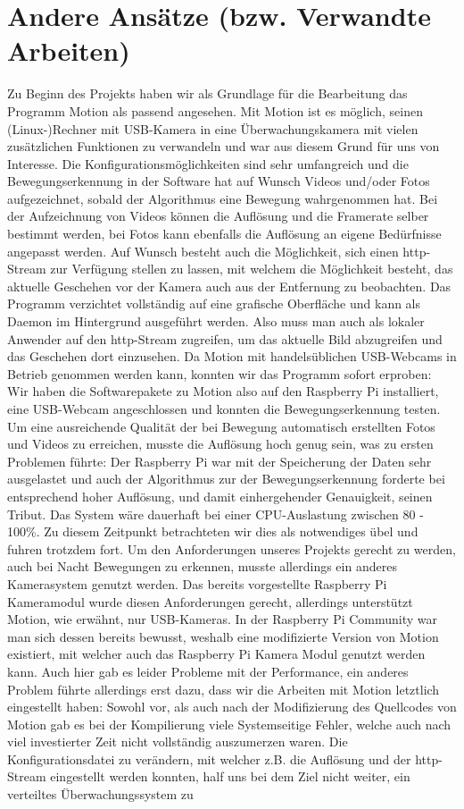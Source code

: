 \documentclass[journal]{IEEEtran}
\begin{document}
\section{Andere Ansätze (bzw. Verwandte Arbeiten)}
Zu Beginn des Projekts haben wir als Grundlage für die Bearbeitung das Programm Motion\cite{motion} als passend angesehen. Mit Motion ist es möglich, seinen (Linux-)Rechner mit USB-Kamera in eine Überwachungskamera mit vielen zusätzlichen Funktionen zu verwandeln und war aus diesem Grund für uns von Interesse. Die Konfigurationsmöglichkeiten sind sehr umfangreich und die Bewegungserkennung in der Software hat auf Wunsch Videos und/oder Fotos aufgezeichnet, sobald der Algorithmus eine Bewegung wahrgenommen hat. Bei der Aufzeichnung von Videos können die Auflösung und die Framerate selber bestimmt werden, bei Fotos kann ebenfalls die Auflösung an eigene Bedürfnisse angepasst werden. Auf Wunsch besteht auch die Möglichkeit, sich einen http-Stream zur Verfügung stellen zu lassen, mit welchem die Möglichkeit besteht, das aktuelle Geschehen vor der Kamera auch aus der Entfernung zu beobachten. Das Programm verzichtet vollständig auf eine grafische Oberfläche und kann als Daemon im Hintergrund ausgeführt werden. Also muss man auch als lokaler Anwender auf den http-Stream zugreifen, um das aktuelle Bild abzugreifen und das Geschehen dort einzusehen. Da Motion mit handelsüblichen USB-Webcams in Betrieb genommen werden kann, konnten wir das Programm sofort erproben: \\ Wir haben die Softwarepakete zu Motion also auf den Raspberry Pi installiert, eine USB-Webcam angeschlossen und konnten die Bewegungserkennung testen. Um eine ausreichende Qualität der bei Bewegung automatisch erstellten Fotos und Videos zu erreichen, musste die Auflösung hoch genug sein, was zu ersten Problemen führte: Der Raspberry Pi war mit der Speicherung der Daten sehr ausgelastet und auch der Algorithmus zur der Bewegungserkennung forderte bei entsprechend hoher Auflösung, und damit einhergehender Genauigkeit, seinen Tribut. Das System wäre dauerhaft bei einer CPU-Auslastung zwischen 80 - 100\%. Zu diesem Zeitpunkt betrachteten wir dies als notwendiges übel und fuhren trotzdem fort. Um den Anforderungen unseres Projekts gerecht zu werden, auch bei Nacht Bewegungen zu erkennen, musste allerdings ein anderes Kamerasystem genutzt werden. Das bereits vorgestellte Raspberry Pi Kameramodul wurde diesen Anforderungen gerecht, allerdings unterstützt Motion, wie erwähnt, nur USB-Kameras. In der Raspberry Pi Community war man sich dessen bereits bewusst, weshalb eine modifizierte Version von Motion existiert, mit welcher auch das Raspberry Pi Kamera Modul genutzt werden kann. Auch hier gab es leider Probleme mit der Performance, ein anderes Problem führte allerdings erst dazu, dass wir die Arbeiten mit Motion letztlich eingestellt haben: Sowohl vor, als auch nach der Modifizierung des Quellcodes von Motion gab es bei der Kompilierung viele Systemseitige Fehler, welche auch nach viel investierter Zeit nicht vollständig auszumerzen waren. Die Konfigurationsdatei zu verändern, mit welcher z.B. die Auflösung und der http-Stream eingestellt werden konnten, half uns bei dem Ziel nicht weiter, ein verteiltes Überwachungssystem zu 
\end{document}
